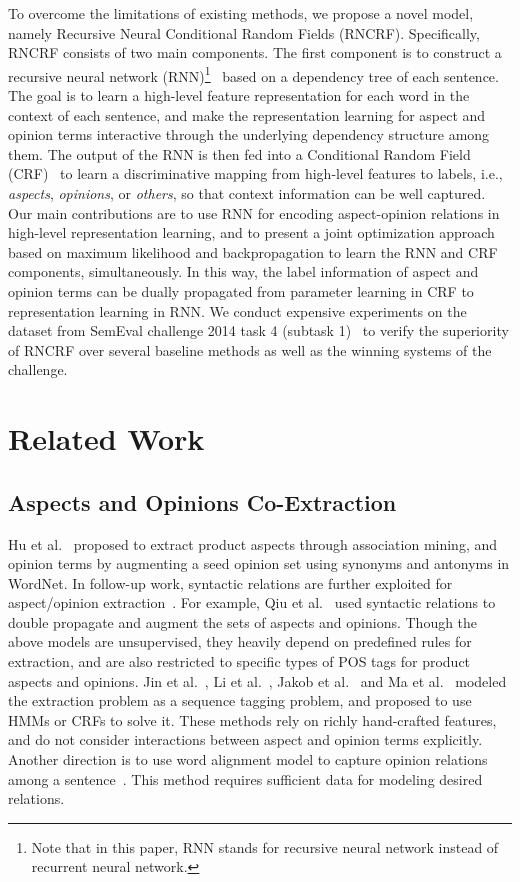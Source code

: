 \documentclass[11pt,letterpaper]{article}
\begin{document}
To overcome the limitations of existing methods, we propose a novel model, namely Recursive Neural Conditional Random Fields (RNCRF). Specifically, RNCRF consists of two main components. The first component is to construct a recursive neural network (RNN)\footnote{Note that in this paper, RNN stands for recursive neural network instead of recurrent neural network.}~\cite{socher10} based on a dependency tree of each sentence. The goal is to learn a high-level feature representation for each word in the context of each sentence, and make the representation learning for aspect and opinion terms interactive through the underlying dependency structure among them. The output of the RNN is then fed into a Conditional Random Field (CRF)~\cite{Lafferty01} to learn a discriminative mapping from high-level features to labels, i.e., \textit{aspects}, \textit{opinions}, or \textit{others}, so that context information can be well captured. Our main contributions are to use RNN for encoding aspect-opinion relations in high-level representation learning, and to present a joint optimization approach based on maximum likelihood and backpropagation to learn the RNN and CRF components, simultaneously. In this way, the label information of aspect and opinion terms can be dually propagated from parameter learning in CRF to representation learning in RNN. We conduct expensive experiments on the dataset from SemEval challenge 2014 task 4 (subtask 1)~\cite{sem14} to verify the superiority of RNCRF over several baseline methods as well as the winning systems of the challenge.


\section{Related Work}

\subsection{Aspects and Opinions Co-Extraction}

Hu et al.~ proposed to extract product aspects through association mining, and opinion terms by augmenting a seed opinion set using synonyms and antonyms in WordNet. In follow-up work, syntactic relations are further exploited for aspect/opinion extraction~\cite{Pop05,Wu09,Qiu11}. For example, Qiu et al.~ used syntactic relations to double propagate and augment the sets of aspects and opinions. Though the above models are unsupervised, they heavily depend on predefined rules for extraction, and are also restricted to specific types of POS tags for product aspects and opinions. Jin et al.~, Li et al.~, Jakob et al.~ and Ma et al.~ modeled the extraction problem as a sequence tagging problem, and proposed to use HMMs or CRFs to solve it. These methods rely on richly hand-crafted features, and do not consider interactions between aspect and opinion terms explicitly. Another direction is to use word alignment model to capture opinion relations among a sentence~\cite{Liu12,Liu13}. This method requires sufficient data for modeling desired relations.
\end{document}
